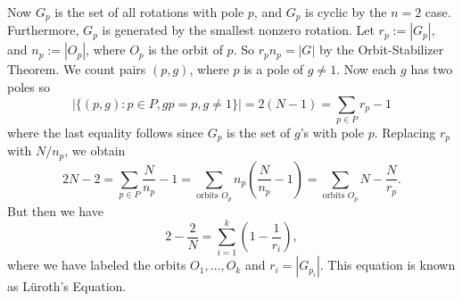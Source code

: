 Now $G_p$ is the set of all rotations with pole $p$, and $G_p$ is cyclic by the $n=2$ case. Furthermore, $G_p$ is generated by the smallest nonzero rotation. Let $r_p:= |G_p|$, and $n_p:=|O_p|$, where $O_p$ is the orbit of $p$. So $r_pn_p=|G|$ by the Orbit-Stabilizer Theorem. We count pairs $(p,g)$, where $p$ is a pole of $g \neq 1$. Now each $g$ has two poles so
	\[
	|\{ (p,g) \colon p \in P, gp=p, g \neq 1\}| = 2 (N-1) = \sum_{p \in P} r_p - 1
	\]
where the last equality follows since $G_p$ is the set of $g$'s with pole $p$. Replacing $r_p$ with $N/n_p$, we obtain 
	\[
	2N-2 = \sum_{p \in P} \dfrac{N}{n_p} -1 = \sum_{\text{orbits }O_p} n_p \left(\dfrac{N}{n_p} -1 \right) = \sum_{\text{orbits }O_p} N - \dfrac{N}{r_p}.
	\]
But then we have
	\[
	2 - \dfrac{2}{N} = \sum_{i=1}^k \left( 1 - \dfrac{1}{r_i}\right),
	\]
where we have labeled the orbits $O_1,\ldots,O_k$ and $r_i= |G_{p_i}|$. This equation is known as L\"uroth's Equation. 

